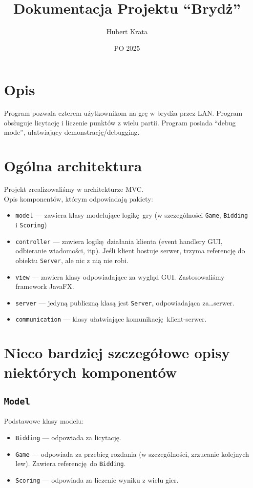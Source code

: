 \documentclass{article}
\title{Dokumentacja Projektu \enquote{Brydż}}
\author{Hubert Krata}
\date{PO 2025}
\newcommand{\ch}[1]{\texttt{#1}}
\begin{document}
\maketitle

\section{Opis}

Program pozwala czterem użytkownikom na grę w brydża przez LAN. Program obsługuje licytację i liczenie punktów z wielu partii. Program posiada \enquote{debug mode}, ułatwiający demonstrację/debugging.

\section{Ogólna architektura}

Projekt zrealizowaliśmy w architekturze MVC.\\

Opis komponentów, którym odpowiadają pakiety:
\begin{itemize}
	\item \ch{model} --- zawiera klasy modelujące logikę gry (w szczególności \ch{Game}, \ch{Bidding} i \ch{Scoring})
	\item \ch{controller} --- zawiera logikę działania klienta (event handlery GUI, odbieranie wiadomości, itp). Jeśli klient hostuje serwer, trzyma referencję do obiektu \ch{Server}, ale nic z nią nie robi.
	\item \ch{view} --- zawiera klasy odpowiadające za wygląd GUI. Zastosowaliśmy framework JavaFX.
	\item \ch{server} --- jedyną publiczną klasą jest \ch{Server}, odpowiadająca za\ldots serwer.
	\item \ch{communication} --- klasy ułatwiające komunikację klient-serwer.
\end{itemize}

\section{Nieco bardziej szczegółowe opisy niektórych komponentów}

\subsection{\ch{Model}}

Podstawowe klasy modelu:
\begin{itemize}
	\item \ch{Bidding} --- odpowiada za licytację.
	\item \ch{Game} --- odpowiada za przebieg rozdania (w szczególności, zrzucanie kolejnych lew). Zawiera referencję do \ch{Bidding}.
	\item \ch{Scoring} --- odpowiada za liczenie wyniku z wielu gier.
\end{itemize}
\end{document}
